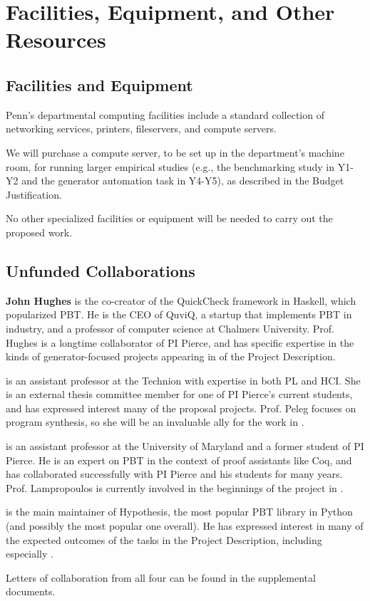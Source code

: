 \section*{Facilities, Equipment, and Other Resources}

\subsection*{Facilities and Equipment}

Penn's departmental computing facilities include a standard collection of
networking services, printers, fileservers, and compute servers.

We will purchase a compute server, to be set up in the department’s
machine room, for running larger empirical studies (e.g., the
benchmarking study in Y1-Y2 and the generator automation task in
Y4-Y5), as described in the Budget Justification.

No other specialized facilities or equipment will be needed to carry
out the proposed work.

\subsection*{Unfunded Collaborations}

 {\bf John Hughes} is the co-creator of the QuickCheck framework in
Haskell, which popularized PBT. He is the CEO of QuviQ, a startup that
implements PBT in industry, and a professor of computer science at Chalmers
University.  Prof. Hughes is a longtime collaborator of PI
Pierce, and has specific expertise in the kinds of generator-focused projects
appearing in  of the Project Description.

 is an assistant professor at the Technion with expertise in both
PL and HCI. She is an external thesis committee member for one of PI Pierce's current
students, and has expressed interest many of the proposal projects. Prof. Peleg
focuses on program synthesis, so she will be an invaluable ally for the work in
.

 is an assistant professor at the
University of Maryland and a former student of PI Pierce.  He is an expert on
PBT in the context of proof assistants like Coq, and has collaborated
successfully with PI Pierce and his students for many years. Prof. Lampropoulos
is currently involved in the beginnings of the project in
.

 is the main maintainer of
Hypothesis, the most popular PBT library in Python (and possibly the most
popular one overall). He has expressed interest in many of the expected outcomes
of the tasks in the Project Description, including especially
.

\smallskip

Letters of collaboration from all four can be found in the supplemental
documents.
